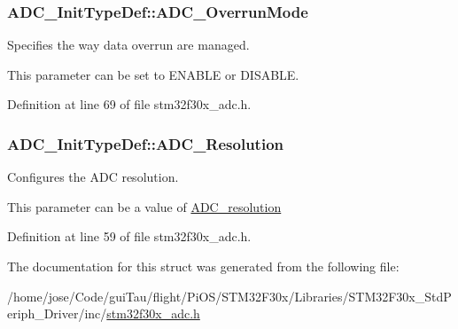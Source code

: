 \hypertarget{struct_a_d_c___init_type_def_af5d17b08dccd56f83b340a594379f4aa}{
\subsubsection[{A\-D\-C\-\_\-\-Overrun\-Mode}]{ A\-D\-C\-\_\-\-Init\-Type\-Def\-::\-A\-D\-C\-\_\-\-Overrun\-Mode}}\label{struct_a_d_c___init_type_def_af5d17b08dccd56f83b340a594379f4aa}
\begin{DoxyVerb}               Specifies the way data overrun are managed.
\end{DoxyVerb}
 This parameter can be set to E\-N\-A\-B\-L\-E or D\-I\-S\-A\-B\-L\-E. 

Definition at line 69 of file stm32f30x\-\_\-adc.\-h.

\hypertarget{struct_a_d_c___init_type_def_a275d9553bbe17a60d618b619678b7c94}{
\subsubsection[{A\-D\-C\-\_\-\-Resolution}]{ A\-D\-C\-\_\-\-Init\-Type\-Def\-::\-A\-D\-C\-\_\-\-Resolution}}\label{struct_a_d_c___init_type_def_a275d9553bbe17a60d618b619678b7c94}
\begin{DoxyVerb}                Configures the ADC resolution.
\end{DoxyVerb}
 This parameter can be a value of \hyperlink{group___a_d_c__resolution}{A\-D\-C\-\_\-resolution} 

Definition at line 59 of file stm32f30x\-\_\-adc.\-h.



The documentation for this struct was generated from the following file\-:\begin{DoxyCompactItemize}
\item 
/home/jose/\-Code/gui\-Tau/flight/\-Pi\-O\-S/\-S\-T\-M32\-F30x/\-Libraries/\-S\-T\-M32\-F30x\-\_\-\-Std\-Periph\-\_\-\-Driver/inc/\hyperlink{stm32f30x__adc_8h}{stm32f30x\-\_\-adc.\-h}\end{DoxyCompactItemize}
